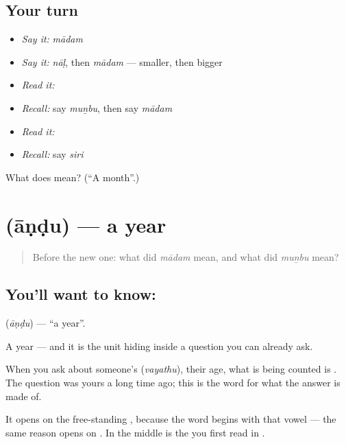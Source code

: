 \subsection*{Your turn}
\begin{itemize}
\raggedright
  \item \emph{Say it:} \emph{mādam}
  \item \emph{Say it:} \emph{nāḷ}, then \emph{mādam} — smaller, then bigger
  \item \emph{Read it:} \textbf{}
  \item \emph{Recall:} say \emph{muṉbu}, then say \emph{mādam}
  \item \emph{Read it:} \textbf{}
  \item \emph{Recall:} say \emph{siri}
\end{itemize}

\begin{tcolorbox}[breakable,colback=teal!4,colframe=teal!35!black,title={Before you move on}]
What does  mean? (\textquotedblleft{}A month\textquotedblright{}.)
\end{tcolorbox}
\section[\texorpdfstring{\ta{ஆண்டு} (āṇḍu)}{ஆண்டு (āṇḍu)}]{ (āṇḍu) — a year}

\label{lesson:TA-C73-year}



\begin{quote}
Before the new one: what did \emph{mādam} mean, and what did \emph{muṉbu} mean?
\end{quote}

\subsection*{You'll want to know: }
\textbf{} (\emph{āṇḍu}) — \textquotedblleft{}a year\textquotedblright{}.

A year — and it is the unit hiding inside a question you can already ask.

When you ask about someone's  (\emph{vayathu}), their age, what is being counted is . The question was yours a long time ago; this is the word for what the answer is made of.

It opens on the free-standing \textbf{}, because the word begins with that vowel — the same reason  opens on . In the middle is the \textbf{} you first read in .


